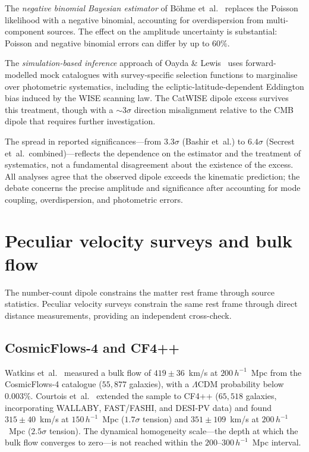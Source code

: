 The \emph{negative binomial Bayesian estimator} of
B{\"o}hme et~al.~\cite{Boehme2025} replaces the Poisson
likelihood with a negative binomial, accounting for
overdispersion from multi-component sources.  The effect on
the amplitude uncertainty is substantial: Poisson and
negative binomial errors can differ by up to $60\%$.

The \emph{simulation-based inference} approach of Oayda \&
Lewis~\cite{OaydaLewis2026} uses forward-modelled mock
catalogues with survey-specific selection functions to
marginalise over photometric systematics, including the
ecliptic-latitude-dependent Eddington bias induced by the
WISE scanning law.  The CatWISE dipole excess survives this
treatment, though with a $\sim\!3\sigma$ direction
misalignment relative to the CMB dipole that requires
further investigation.

The spread in reported significances---from $3.3\sigma$
(Bashir et~al.) to $6.4\sigma$ (Secrest
et~al.\ combined)---reflects the dependence on the
estimator and the treatment of systematics, not a
fundamental disagreement about the existence of the excess.
All analyses agree that the observed dipole exceeds the
kinematic prediction; the debate concerns the precise
amplitude and significance after accounting for
mode coupling, overdispersion, and photometric errors.


\section{Peculiar velocity surveys and bulk flow}
\label{sec:dipole-pv}

The number-count dipole constrains the matter rest frame
through source statistics.  Peculiar velocity surveys
constrain the same rest frame through direct distance
measurements, providing an independent cross-check.


\subsection{CosmicFlows-4 and CF4++}
\label{sec:cf4}

Watkins et~al.~\cite{Watkins2023} measured a bulk flow of
$419 \pm 36$~km/s at $200\,h^{-1}$~Mpc from the
CosmicFlows-4 catalogue ($55{,}877$ galaxies), with a
$\Lambda$CDM probability below $0.003\%$.  Courtois
et~al.~\cite{Courtois2025} extended the sample to CF4++
($65{,}518$ galaxies, incorporating WALLABY, FAST/FASHI,
and DESI-PV data) and found $315 \pm 40$~km/s at
$150\,h^{-1}$~Mpc ($1.7\sigma$ tension) and
$351 \pm 109$~km/s at $200\,h^{-1}$~Mpc ($2.5\sigma$
tension).  The dynamical homogeneity scale---the depth at
which the bulk flow converges to zero---is not reached
within the $200$--$300\,h^{-1}$~Mpc interval.


